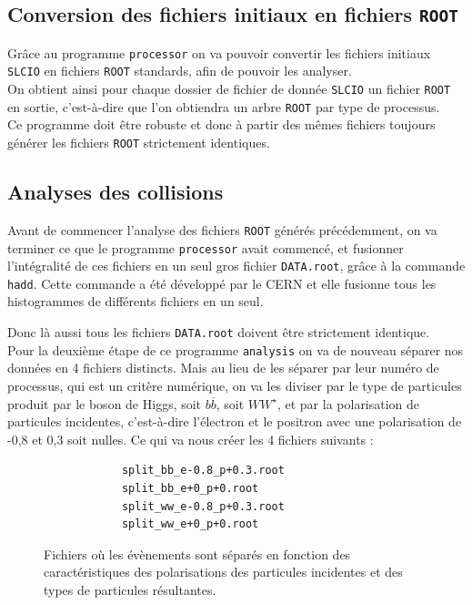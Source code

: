 \documentclass[10pt,a4paper]{report}
\newcommand{\cad}{c'est-à-dire\xspace}
\newcommand{\ROOT}{\texttt{ROOT}\xspace}
\newcommand{\SLCIO}{\texttt{SLCIO}\xspace}
\newcommand{\processor}{\texttt{processor}\xspace}
\newcommand{\analysis}{\texttt{analysis}\xspace}
\newcommand{\bbar}{\overline{b}}
\newcommand{\Wstar}{W^{\star}}
\begin{document}

\subsection{Conversion des fichiers initiaux en fichiers \ROOT}

Grâce au programme \processor on va pouvoir convertir les fichiers initiaux \SLCIO en fichiers \ROOT standards, afin de pouvoir les analyser.\\

On obtient ainsi pour chaque dossier de fichier de donnée \SLCIO un fichier \ROOT en sortie, \cad que l'on obtiendra un arbre \ROOT par type de processus.\\

Ce programme doit être robuste et donc à partir des mêmes fichiers toujours générer les fichiers \ROOT strictement identiques.

\subsection{Analyses des collisions}

Avant de commencer l'analyse des fichiers \ROOT générés précédemment, on va terminer ce que le programme \processor avait commencé, et fusionner l'intégralité de ces fichiers en un seul gros fichier \texttt{DATA.root}, grâce à la commande \texttt{hadd}. 
Cette commande a été développé par le CERN et elle fusionne tous les histogrammes de différents fichiers en un seul. 

Donc là aussi tous les fichiers \texttt{DATA.root} doivent être strictement identique. \\

Pour la deuxième étape de ce programme \analysis on va de nouveau séparer nos données en 4 fichiers distincts. 
Mais au lieu de les séparer par leur numéro de processus, qui est un critère numérique, on va les diviser par le type de particules produit par le boson de Higgs, soit $b\bbar$, soit $W\Wstar$, et par la polarisation de particules incidentes, \cad l'électron et le positron avec une polarisation de -0,8 et 0,3 soit nulles.
Ce qui va nous créer les 4 fichiers suivants :

\begin{figure}[h!]
	\centering
	\begin{lstlisting}
			split_bb_e-0.8_p+0.3.root
			split_bb_e+0_p+0.root
			split_ww_e-0.8_p+0.3.root
			split_ww_e+0_p+0.root
	\end{lstlisting}
	\label{files:split}
	\caption{Fichiers où les évènements sont séparés en fonction des caractéristiques des polarisations des particules incidentes et des types de particules résultantes.}
\end{figure}
\end{document}
